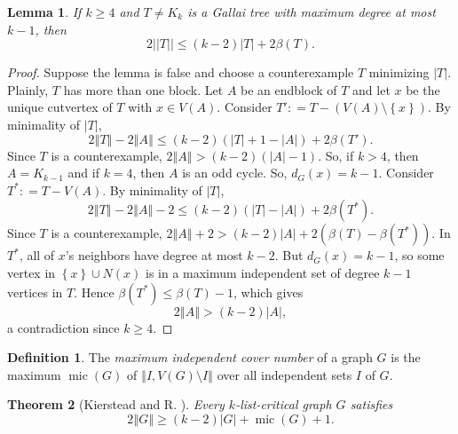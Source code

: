 \documentclass[12pt]{article}
\theoremstyle{plain}
\newtheorem{thm}{Theorem}
\newtheorem{lem}[thm]{Lemma}
\theoremstyle{definition}
\newtheorem{defn}{Definition}
\theoremstyle{remark}
\newcommand{\set}[1]{\left\{ #1 \right\}}
\newcommand{\card}[1]{\left|#1\right|}
\newcommand{\size}[1]{\left\Vert#1\right\Vert}
\newcommand{\DefinedAs}{\mathrel{\mathop:}=}
\newcommand{\mic}{\operatorname{mic}}
\begin{document}
\begin{lem}\label{SimpleGallaiBetaBound}
	If $k \ge 4$ and $T \ne K_k$ is a Gallai tree with maximum degree at most $k-1$, then
	\[2||T|| \le (k-2)|T| + 2\beta(T).\]
\end{lem}
\begin{proof}
	Suppose the lemma is false and choose a counterexample $T$ minimizing $\card{T}$.  Plainly, $T$ has more than one block.  Let $A$ be an endblock of $T$ and let $x$ be the unique cutvertex of $T$ with $x \in V(A)$.
	Consider $T' \DefinedAs T - (V(A)\setminus\set{x})$.  By minimality of $\card{T}$,
	\begin{equation*}
		2\size{T} - 2\size{A} \le (k-2)(\card{T} + 1 - \card{A}) + 2\beta(T').
	\end{equation*}
		Since $T$ is a counterexample, $2\size{A} > (k-2)(\card{A} - 1)$.  So, if $k > 4$, then $A = K_{k-1}$ and if $k=4$, then $A$ is an odd cycle.  So, $d_G(x) = k-1$.
	Consider $T^* \DefinedAs T - V(A)$.  By minimality of $\card{T}$,
	\begin{equation*}
	2\size{T} - 2\size{A} - 2 \le (k-2)(\card{T} - \card{A}) + 2\beta(T^*).
	\end{equation*}
	Since $T$ is a counterexample, $2\size{A} + 2 > (k-2)\card{A} + 2(\beta(T) - \beta(T^*))$.  In $T^*$, all of $x$'s neighbors have degree at most $k-2$.
	But $d_G(x) = k-1$, so some vertex in $\set{x} \cup N(x)$ is in a maximum independent set of degree $k-1$ vertices in $T$.  Hence $\beta(T^*) \le \beta(T) - 1$, which gives
	\begin{equation*}
	 2\size{A} > (k-2)\card{A},
	\end{equation*}
	a contradiction since $k \ge 4$.
\end{proof}

\begin{defn} The \emph{maximum independent cover number }of a graph $G$
	is the maximum $\mic(G)$ of $\size{I, V(G) \setminus I}$ over all independent sets $I$
	of $G$. 
\end{defn}

\begin{thm}[Kierstead and R. \cite{KernelMagic}]\label{ConsantListMicStrength} 
	Every $k$-list-critical graph $G$ satisfies
	\[2\size{G} \ge (k-2)\card{G} + \mic(G) + 1.\]
\end{thm}
\end{document}
